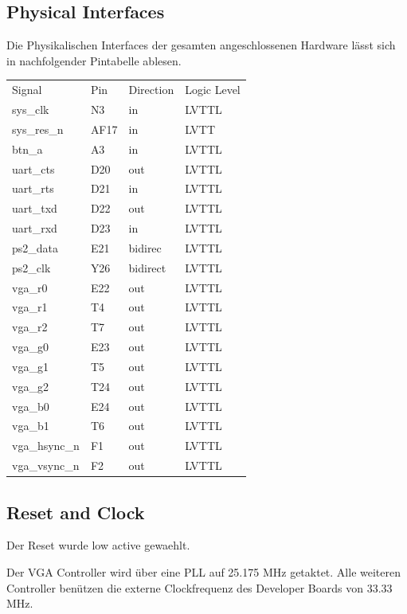 \subsection{Physical Interfaces}
Die Physikalischen Interfaces der gesamten angeschlossenen Hardware lässt sich
in nachfolgender Pintabelle ablesen.
\begin{table}[!ht]
 \begin{center}
  \begin{tabular}{|l|l|l|l|}
   \hline Signal & Pin &Direction &Logic Level\\
   sys\_clk & N3 & in & LVTTL\\
   sys\_res\_n & AF17 & in & LVTT\\
   btn\_a & A3 & in & LVTTL\\
   uart\_cts & D20 & out & LVTTL\\
   uart\_rts & D21 & in & LVTTL\\
   uart\_txd & D22 & out & LVTTL\\
   uart\_rxd & D23 & in & LVTTL\\
   ps2\_data & E21 & bidirec & LVTTL\\
   ps2\_clk & Y26 & bidirect & LVTTL\\
   vga\_r0 & E22 & out & LVTTL\\
   vga\_r1 & T4 & out & LVTTL\\
   vga\_r2 & T7 & out & LVTTL\\
   vga\_g0 & E23 & out & LVTTL\\
   vga\_g1 & T5 & out & LVTTL\\
   vga\_g2 & T24 & out & LVTTL\\
   vga\_b0 & E24 & out & LVTTL\\
   vga\_b1 & T6 & out & LVTTL\\
   vga\_hsync\_n & F1 & out & LVTTL\\
   vga\_vsync\_n & F2 & out & LVTTL\\
   \hline
  \end{tabular}
 \end{center}
\end{table}


\subsection{Reset and Clock}
Der Reset wurde low active gewaehlt.

Der VGA Controller wird über eine PLL auf 25.175 MHz getaktet. 
Alle weiteren Controller benützen die externe Clockfrequenz
des Developer Boards von 33.33 MHz.

